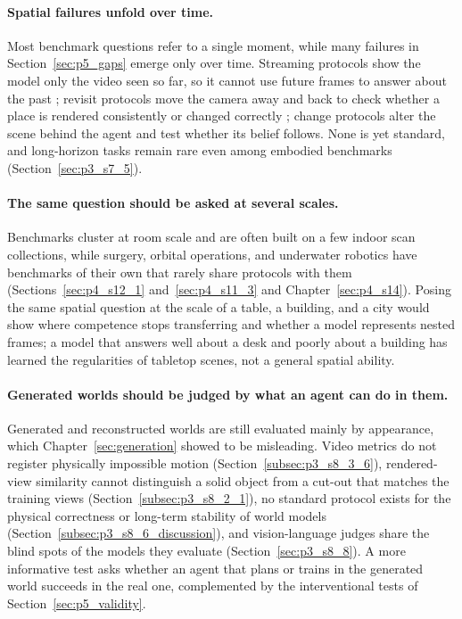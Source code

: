 \paragraph{Spatial failures unfold over time.}
Most benchmark questions refer to a single moment, while many failures in Section~\ref{sec:p5_gaps} emerge only over time.
Streaming protocols show the model only the video seen so far, so it cannot use future frames to answer about the past \cite{li2026ovosbench}; revisit protocols move the camera away and back to check whether a place is rendered consistently or changed correctly \cite{wang2026worldprobe}; change protocols alter the scene behind the agent and test whether its belief follows.
None is yet standard, and long-horizon tasks remain rare even among embodied benchmarks (Section~\ref{sec:p3_s7_5}).

\paragraph{The same question should be asked at several scales.}
Benchmarks cluster at room scale and are often built on a few indoor scan collections, while surgery, orbital operations, and underwater robotics have benchmarks of their own that rarely share protocols with them (Sections~\ref{sec:p4_s12_1} and~\ref{sec:p4_s11_3} and Chapter~\ref{sec:p4_s14}).
Posing the same spatial question at the scale of a table, a building, and a city would show where competence stops transferring and whether a model represents nested frames; a model that answers well about a desk and poorly about a building has learned the regularities of tabletop scenes, not a general spatial ability.

\paragraph{Generated worlds should be judged by what an agent can do in them.}
Generated and reconstructed worlds are still evaluated mainly by appearance, which Chapter~\ref{sec:generation} showed to be misleading.
Video metrics do not register physically impossible motion (Section~\ref{subsec:p3_s8_3_6}), rendered-view similarity cannot distinguish a solid object from a cut-out that matches the training views (Section~\ref{subsec:p3_s8_2_1}), no standard protocol exists for the physical correctness or long-term stability of world models (Section~\ref{subsec:p3_s8_6_discussion}), and vision-language judges share the blind spots of the models they evaluate (Section~\ref{sec:p3_s8_8}).
A more informative test asks whether an agent that plans or trains in the generated world succeeds in the real one, complemented by the interventional tests of Section~\ref{sec:p5_validity}.

